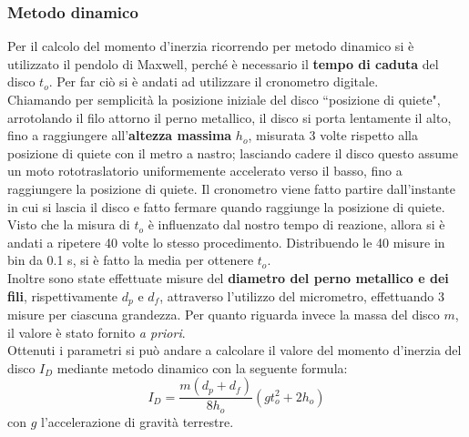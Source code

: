 \subsubsection*{Metodo dinamico}
Per il calcolo del momento d'inerzia ricorrendo per metodo dinamico si è utilizzato il pendolo di Maxwell, perché è necessario il \textbf{tempo di caduta} del disco $t_o$. Per far ciò si è andati ad utilizzare il cronometro digitale.\\
Chiamando per semplicità la posizione iniziale del disco “posizione di quiete", arrotolando il filo attorno il perno metallico, il disco si porta lentamente il alto, fino a raggiungere all'\textbf{altezza massima} $h_o$, misurata 3 volte rispetto alla posizione di quiete con il metro a nastro; lasciando cadere il disco questo assume un moto rototraslatorio uniformemente accelerato verso il basso, fino a raggiungere la posizione di quiete. Il cronometro viene fatto partire dall'instante in cui si lascia il disco e fatto fermare quando raggiunge la posizione di quiete.\\
Visto che la misura di $t_o$ è influenzato dal nostro tempo di reazione, allora si è andati a ripetere  40 volte lo stesso procedimento. Distribuendo le 40 misure in bin da 0.1 s, si è fatto la media per ottenere $t_o$.\\
Inoltre sono state effettuate misure del \textbf{diametro del perno metallico e dei fili}, rispettivamente $d_p$ e $d_f$, attraverso l'utilizzo del micrometro, effettuando 3 misure per ciascuna grandezza.
Per quanto riguarda invece la massa del disco $m$, il valore è stato fornito \textit{a priori}.\\

Ottenuti i parametri si può andare a calcolare il valore del momento d'inerzia del disco $I_D$ mediante metodo dinamico con la seguente formula:
\begin{equation} \label{I_D}
\displaystyle I_D = \frac{m(d_p + d_f)}{8h_o}(gt_o^2+2h_o)
\end{equation}
con $g$ l'accelerazione di gravità terrestre.